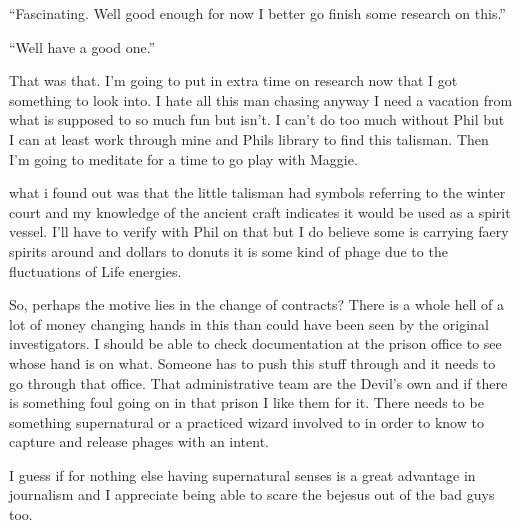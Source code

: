 ``Fascinating. Well good enough for now I better go finish some research on this.''

``Well have a good one.''

That was that. I'm going to put in extra time on research now that I got something to look into. I hate all this man chasing anyway I need a vacation from what is supposed to so much fun but isn't. I can't do too much without Phil but I can at least work through mine and Phils library to find this talisman. Then I'm going to meditate for a time to go play with Maggie.

what i found out was that the little talisman had symbols referring to the winter court and my knowledge of the ancient craft indicates it would be used as a spirit vessel. I'll have to verify with Phil on that but I do believe some is carrying faery spirits around and dollars to donuts it is some kind of phage due to the fluctuations of Life energies.

So, perhaps the motive lies in the change of contracts? There is a whole hell of a lot of money changing hands in this than could have been seen by the original investigators. I should be able to check documentation at the prison office to see whose hand is on what. Someone has to push this stuff through and it needs to go through that office. That administrative team are the Devil's own and if there is something foul going on in that prison I like them for it. There needs to be something supernatural or a practiced wizard involved to in order to know to capture and release phages with an intent.

I guess if for  nothing else having supernatural senses is a great advantage in journalism and I appreciate being able to scare the bejesus out of the bad guys too.


